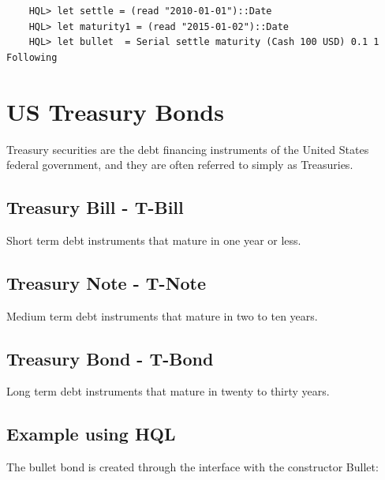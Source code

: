 \documentclass[11pt,a4paper]{article}
\numberwithin{equation}{section}
\begin{document}
	\begin{lstlisting}
	HQL> let settle = (read "2010-01-01")::Date
	HQL> let maturity1 = (read "2015-01-02")::Date
	HQL> let bullet  = Serial settle maturity (Cash 100 USD) 0.1 1 Following
	\end{lstlisting}

	\section{US Treasury Bonds}
	Treasury securities are the debt financing instruments of the United States federal government, and they are often referred to simply as Treasuries.
	\subsection{Treasury Bill - T-Bill}
	Short term debt instruments that mature in one year or less.
	\subsection{Treasury Note - T-Note}
	Medium term debt instruments that mature in two to ten years.
	\subsection{Treasury Bond - T-Bond}
	Long term debt instruments that mature in twenty to thirty years.

	\subsection{Example using HQL}
 The bullet bond is created through the interface with the constructor Bullet:
\end{document}
